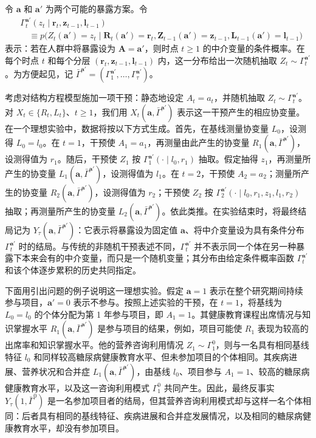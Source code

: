 令 $\mathbf a$ 和 $\mathbf a'$ 为两个可能的暴露方案。令
\[
\begin{aligned}
 &\Gamma_t^{\mathbf a'}(z_t\mid\mathbf r_t,\mathbf z_{t-1},\mathbf l_{t-1})\\
 &\quad\equiv p\bigl(Z_t(\mathbf a')=z_t\mid\mathbf R_t(\mathbf a')=\mathbf r_t,
 \mathbf Z_{t-1}(\mathbf a')=\mathbf z_{t-1},\mathbf L_{t-1}(\mathbf a')=\mathbf l_{t-1}\bigr)
\end{aligned}
\]
表示：若在人群中将暴露设为 $\mathbf A=\mathbf a'$，则时点 $t\geq1$ 的中介变量的条件概率。在每个时点 $t$ 和每个分层 $(\mathbf r_t,\mathbf z_{t-1},\mathbf l_{t-1})$ 内，这一分布给出一次随机抽取 $Z_t\sim\Gamma_t^{\mathbf a'}$。为方便起见，记 $\bar\Gamma^{\mathbf a'}=(\Gamma_1^{\mathbf a'},\ldots,\Gamma_\tau^{\mathbf a'})$。

考虑对结构方程模型施加一项干预：静态地设定 $A_t=a_t$，并随机抽取 $Z_t\sim\Gamma_t^{\mathbf a'}$。对 $X_t\in\{R_t,L_t\}$、$t\geq1$，我们用 $X_t(\mathbf a,\bar\Gamma^{\mathbf a'})$ 表示这一干预产生的相应协变量。在一个理想实验中，数据将按以下方式生成。首先，在基线测量协变量 $L_0$，设测得 $L_0=l_0$。在 $t=1$，干预使 $A_1=a_1$，再测量由此产生的协变量 $R_1(\mathbf a,\bar\Gamma^{\mathbf a'})$，设测得值为 $r_1$。随后，干预使 $Z_1$ 按 $\Gamma_1^{\mathbf a'}(\cdot\mid l_0,r_1)$ 抽取。假定抽得 $z_1$，再测量所产生的协变量 $L_1(\mathbf a,\bar\Gamma^{\mathbf a'})$，设测得值为 $l_1$。在 $t=2$，干预使 $A_2=a_2$；测量所产生的协变量 $R_2(\mathbf a,\bar\Gamma^{\mathbf a'})$，设测得值为 $r_2$；干预使 $Z_2$ 按 $\Gamma_2^{\mathbf a'}(\cdot\mid l_0,r_1,z_1,l_1,r_2)$ 抽取；再测量所产生的协变量 $L_2(\mathbf a,\bar\Gamma^{\mathbf a'})$。依此类推。在实验结束时，将最终结局记为 $Y_\tau(\mathbf a,\bar\Gamma^{\mathbf a'})$：它表示将暴露设为固定值 $\mathbf a$、将中介变量设为具有条件分布 $\Gamma_t^{\mathbf a'}$ 时的结局。与传统的非随机干预表述不同，$\Gamma_t^{\mathbf a'}$ 并不表示同一个体在另一种暴露下本来会有的中介变量，而只是一个随机变量；其分布由给定条件概率函数 $\Gamma_t^{\mathbf a'}$ 和该个体逐步累积的历史共同指定。

下面用引出问题的例子说明这一理想实验。假定 $\mathbf a=1$ 表示在整个研究期间持续参与项目，$\mathbf a'=0$ 表示不参与。按照上述实验的干预，在 $t=1$，将基线为 $L_0=l_0$ 的个体分配为第 1 年参与项目，即 $A_1=1$。其健康教育课程出席情况与知识掌握水平 $R_1(\mathbf a,\bar\Gamma^{\mathbf a'})$ 是参与项目的结果，例如，项目可能使 $R_1$ 表现为较高的出席率和知识掌握水平。他的营养咨询利用情况 $Z_1\sim\Gamma_1^0$，则与一名具有相同基线特征 $l_0$ 和同样较高糖尿病健康教育水平、但未参加项目的个体相同。其疾病进展、营养状况和合并症 $L_1(\mathbf a,\bar\Gamma^{\mathbf a'})$，由基线 $l_0$、项目参与 $A_1=1$、较高的糖尿病健康教育水平，以及这一咨询利用模式 $\Gamma_1^0$ 共同产生。因此，最终反事实 $Y_\tau(1,\bar\Gamma^0)$ 是一名参加项目者的结局，但其营养咨询利用模式却与这样一名个体相同：后者具有相同的基线特征、疾病进展和合并症发展情况，以及相同的糖尿病健康教育水平，却没有参加项目。
